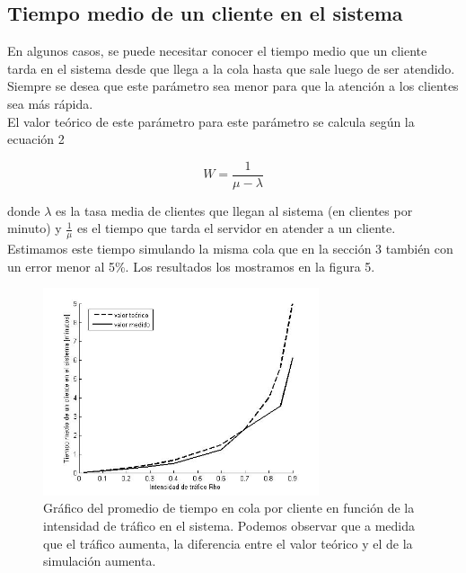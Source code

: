 \documentclass[10pt,journal,compsoc]{IEEEtran}
\begin{document}
\subsection{Tiempo medio de un cliente en el sistema} %
En algunos casos, se puede necesitar conocer el tiempo medio que un cliente tarda en el sistema desde
que llega a la cola hasta que sale luego de ser atendido. Siempre se desea que este par\'ametro sea
menor para que la atenci\'on a los clientes sea m\'as r\'apida.\\
El valor te\'orico de este par\'ametro para este par\'ametro se calcula seg\'un la ecuaci\'on 2

\begin{equation}
  W = \frac{1}{\mu - \lambda}
\end{equation}

donde $\lambda$ es la tasa media de clientes que llegan al sistema (en clientes por minuto) y
$\frac{1}{\mu}$ es el tiempo que tarda el servidor en atender a un cliente.\\
Estimamos este tiempo simulando la misma cola que en la secci\'on 3 tambi\'en con un error menor al 5\%.
Los resultados los mostramos en la figura 5.

\begin{figure}[t]%
\label{fig:puntouno}
\begin{center}
\centering
\includegraphics[width=3.2in]{plot_w.jpg}
\caption{Gr\'afico del promedio de tiempo en cola por cliente en funci\'on de la intensidad de tr\'afico en el sistema. Podemos observar que a medida que el tr\'afico aumenta, la diferencia entre el valor te\'orico y el de la simulaci\'on aumenta.}
\end{center}
\end{figure}

\end{document}
